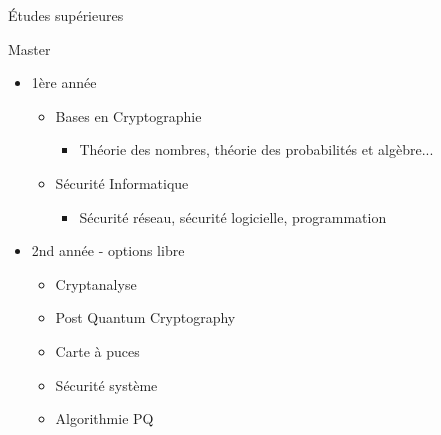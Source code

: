 \documentclass[hyperref={bookmarks=false},aspectratio=169]{beamer}
\begin{document}
\begin{frame}{Études supérieures}
\begin{alertblock}{Master}
  \begin{itemize}
    \item 1ère année
    \begin{itemize}
      \item Bases en Cryptographie
      \begin{itemize}
        \item Théorie des nombres, théorie des probabilités et algèbre...
      \end{itemize}
      \item Sécurité Informatique
      \begin{itemize}
        \item Sécurité réseau, sécurité logicielle, programmation
      \end{itemize} 
    \end{itemize}
  \end{itemize}

  \begin{itemize}
    \item 2nd année - options libre
    \begin{itemize}
      \item Cryptanalyse
      \item Post Quantum Cryptography
      \item Carte à puces
      \item Sécurité système
      \item Algorithmie PQ
    \end{itemize}
  \end{itemize}
\end{alertblock}
\end{frame}
\end{document}
